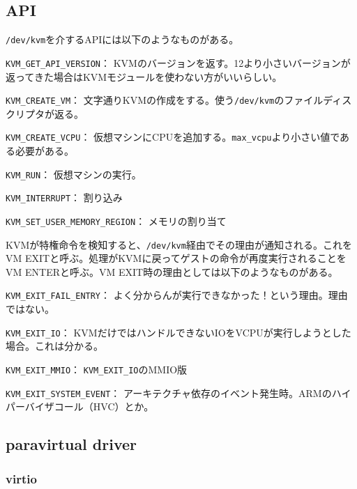 ﻿\documentclass[9pt,b5paper,tombo,openany]{jsbook}
\begin{document}
\subsection{API}

\verb|/dev/kvm|を介するAPIには以下のようなものがある。

\begin{description}
	\item{\verb|KVM_GET_API_VERSION|：}
	KVMのバージョンを返す。12より小さいバージョンが返ってきた場合はKVMモジュールを使わない方がいいらしい。
	\item{\verb|KVM_CREATE_VM|：}
	文字通りKVMの作成をする。使う\verb|/dev/kvm|のファイルディスクリプタが返る。
	\item{\verb|KVM_CREATE_VCPU|：}
	仮想マシンにCPUを追加する。\verb|max_vcpu|より小さい値である必要がある。
	\item{\verb|KVM_RUN|：}
	仮想マシンの実行。
	\item{\verb|KVM_INTERRUPT|：}
	割り込み
	\item{\verb|KVM_SET_USER_MEMORY_REGION|：}
	メモリの割り当て
\end{description}

KVMが特権命令を検知すると、\verb|/dev/kvm|経由でその理由が通知される。これをVM EXITと呼ぶ。処理がKVMに戻ってゲストの命令が再度実行されることをVM ENTERと呼ぶ。VM EXIT時の理由としては以下のようなものがある。

\begin{description}
	\item{\verb|KVM_EXIT_FAIL_ENTRY|：}
	よく分からんが実行できなかった！という理由。理由ではない。
	\item{\verb|KVM_EXIT_IO|：}
	KVMだけではハンドルできないIOをVCPUが実行しようとした場合。これは分かる。
	\item{\verb|KVM_EXIT_MMIO|：}
	\verb|KVM_EXIT_IO|のMMIO版
	\item{\verb|KVM_EXIT_SYSTEM_EVENT|：}
	アーキテクチャ依存のイベント発生時。ARMのハイパーバイザコール（HVC）とか。
\end{description}

\subsection{paravirtual driver}

\subsubsection{virtio}
\end{document}

